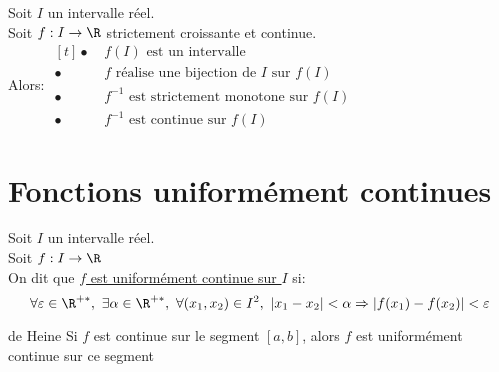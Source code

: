 \documentclass[12pt,twoside,a4paper]{article}
\begin{document}
		\begin{coro}
			Soit $I$ un intervalle r\'eel.\\
			Soit $f:I\rightarrow\R$ strictement croissante et continue.\\
			Alors: $\begin{aligned}[t]
			\bullet \ & f(I)\text{ est un intervalle}\\
			\bullet \ & f \text{ r\'ealise une bijection de }I\text{ sur }f(I)\\
			\bullet \ & f^{-1}\text{ est strictement monotone sur }f(I)\\
			\bullet \ & f^{-1}\text{ est continue sur }f(I)
			\end{aligned}$
		\end{coro}
	\section{Fonctions uniform\'ement continues}
		\begin{defi}
			Soit $I$ un intervalle r\'eel.\\
			Soit $f:I\rightarrow\R$\\
			On dit que \underline{$f$ est uniform\'ement continue sur $I$} si:
			$$\forall\varepsilon\in\R^{+*},\ \exists\alpha\in\R^{+*},\ \forall(x_1,x_2)\in I^{2},\ |x_1-x_2|<\alpha\Rightarrow |f(x_1)-f(x_2)|<\varepsilon$$
		\end{defi}
		\begin{theo}{de Heine}
			Si $f$ est continue sur le segment $[a,b]$, alors $f$ est uniform\'ement continue sur ce segment
		\end{theo}
\end{document}
